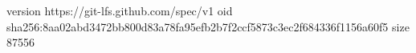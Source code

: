 version https://git-lfs.github.com/spec/v1
oid sha256:8aa02abd3472bb800d83a78fa95efb2b7f2ccf5873c3ec2f684336f1156a60f5
size 87556
